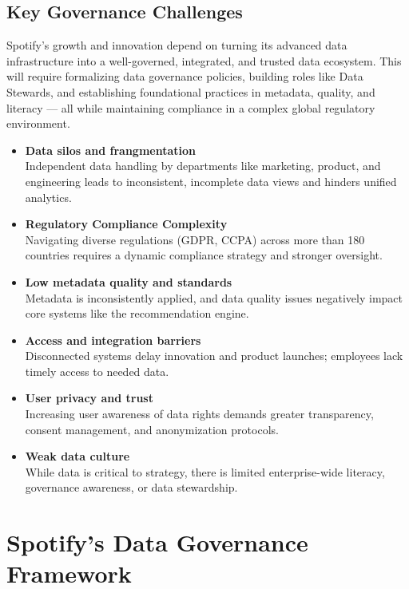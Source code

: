 \documentclass[11pt,a4paper,computermodern]{article}
\begin{document}
\subsection*{Key Governance Challenges}

Spotify's growth and innovation depend on turning its advanced data infrastructure into a well-governed, integrated, and trusted data ecosystem. This will require formalizing data governance policies, building roles like Data Stewards, and establishing foundational practices in metadata, quality, and literacy — all while maintaining compliance in a complex global regulatory environment.

\begin{itemize}
	\item \textbf{Data silos and frangmentation}\\
	Independent data handling by departments like marketing, product, and engineering leads to inconsistent, incomplete data views and hinders unified analytics.
	\item \textbf{Regulatory Compliance Complexity}\\
	Navigating diverse regulations (GDPR, CCPA) across more than 180 countries requires a dynamic compliance strategy and stronger oversight.
	\item \textbf{Low metadata quality and standards}\\
	Metadata is inconsistently applied, and data quality issues negatively impact core systems like the recommendation engine.
	\item \textbf{Access and integration barriers}\\
	Disconnected systems delay innovation and product launches; employees lack timely access to needed data.
	\item \textbf{User privacy and trust}\\
	Increasing user awareness of data rights demands greater transparency, consent management, and anonymization protocols.
	\item \textbf{Weak data culture}\\
	While data is critical to strategy, there is limited enterprise-wide literacy, governance awareness, or data stewardship.
\end{itemize}



\section{Spotify's Data Governance Framework}
\end{document}
